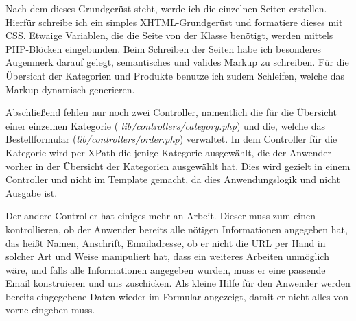 Nach dem dieses Grundgerüst steht, werde ich die einzelnen Seiten
erstellen. Hierfür schreibe ich ein simples XHTML-Grundgerüst und
formatiere dieses mit CSS. Etwaige Variablen, die die Seite von der
Klasse benötigt, werden mittels PHP-Blöcken eingebunden. Beim
Schreiben der Seiten habe ich besonderes Augenmerk darauf gelegt,
semantisches und valides Markup zu schreiben. Für die Übersicht der
Kategorien und Produkte benutze ich zudem Schleifen, welche das
Markup dynamisch generieren.

Abschließend fehlen nur noch zwei Controller, namentlich die für die
Übersicht einer einzelnen Kategorie ({\em
  lib/controllers/category.php}) und die, welche das Bestellformular
({\em lib/controllers/order.php}) verwaltet. In dem Controller für die
Kategorie wird per XPath die jenige Kategorie ausgewählt, die der
Anwender vorher in der Übersicht der Kategorien ausgewählt hat. Dies
wird gezielt in einem Controller und nicht im Template gemacht, da
dies Anwendungslogik und nicht Ausgabe ist.

Der andere Controller hat einiges mehr an Arbeit. Dieser muss zum
einen kontrollieren, ob der Anwender bereits alle nötigen
Informationen angegeben hat, das heißt Namen, Anschrift, Emailadresse,
ob er nicht die URL per Hand in solcher Art und Weise manipuliert hat,
dass ein weiteres Arbeiten unmöglich wäre, und falls alle
Informationen angegeben wurden, muss er eine passende Email
konstruieren und uns zuschicken. Als kleine Hilfe für den Anwender
werden bereits eingegebene Daten wieder im Formular angezeigt, damit
er nicht alles von vorne eingeben muss.
